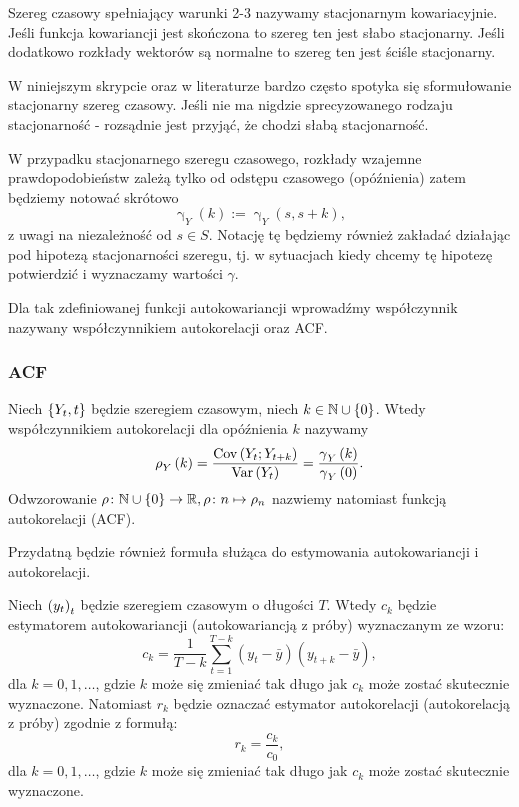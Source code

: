 \documentclass[10pt,a4paper]{book}
\newcommand{\tsAutoCovariance}[3][\gamma]{\operatorname{#1}_{#2} \left({#3}\right)}
\newcommand{\tsAutoCorellation}[3][\rho]{\operatorname{#1}_{#2} \left({#3}\right)}
\begin{document}
\begin{remark}
Szereg czasowy spełniający warunki 2-3 nazywamy stacjonarnym kowariacyjnie. Jeśli funkcja kowariancji jest skończona to szereg ten jest słabo stacjonarny. Jeśli dodatkowo rozkłady wektorów są normalne to szereg ten jest ściśle stacjonarny.
\end{remark}

\begin{remark}
W niniejszym skrypcie oraz w literaturze bardzo często spotyka się sformułowanie stacjonarny szereg czasowy. Jeśli nie ma nigdzie sprecyzowanego rodzaju stacjonarność - rozsądnie jest przyjąć, że chodzi słabą stacjonarność.
\end{remark}

\begin{remark}
W przypadku stacjonarnego szeregu czasowego, rozkłady wzajemne prawdopodobieństw zależą tylko od odstępu czasowego (opóźnienia) zatem będziemy notować skrótowo 
$$
\tsAutoCovariance{Y}{k} := \tsAutoCovariance{Y}{s,s+k},
$$
z uwagi na niezależność od $s \in S$. Notację tę będziemy również zakładać działając pod hipotezą stacjonarności szeregu, tj. w sytuacjach kiedy chcemy tę hipotezę potwierdzić i wyznaczamy wartości $\gamma$.
\end{remark}

Dla tak zdefiniowanej funkcji autokowariancji wprowadźmy współczynnik nazywany współczynnikiem autokorelacji oraz ACF.

\subsubsection{ACF}

\begin{definition}
Niech $\left\lbrace {{Y_t}, {t}} \right\rbrace$ będzie szeregiem czasowym, niech $k \in \mathbb{N} \cup \left\lbrace {0} \right\rbrace $. Wtedy współczynnikiem autokorelacji dla opóźnienia $k$ nazywamy
$$
\tsAutoCorellation{Y}{k}= \frac{\Covariance{Y_t}{Y_{t+k}}}{\Variance{Y_t}} = \frac{\tsAutoCovariance{Y}{k} }{\tsAutoCovariance{Y}{0}}.
$$
Odwzorowanie $\rho\colon \mathbb{N} \cup \left\lbrace {0} \right\rbrace \to \mathbb{R},  \rho \colon n \mapsto \rho_n$ nazwiemy natomiast funkcją autokorelacji (ACF).
\end{definition}

Przydatną będzie również formuła służąca do estymowania autokowariancji i autokorelacji.

\begin{definition}
Niech $\left( {y_t} \right)_{t}^{}$ będzie szeregiem czasowym o długości $T$. Wtedy $c_k$ będzie estymatorem autokowariancji (autokowariancją z próby) wyznaczanym ze wzoru:
$$
c_k = \frac{1}{T-k}	 \sum_{t=1}^{T-k} (y_t - \bar{y}) (y_{t+k} - \bar{y}),
$$
dla $k = 0,1, \ldots$, gdzie $k$ może się zmieniać tak długo jak $c_k$ może zostać skutecznie wyznaczone.
Natomiast $r_k$ będzie oznaczać estymator autokorelacji (autokorelacją z próby) zgodnie z formułą:
$$
r_k = \frac{c_k}{c_0},
$$
dla $k = 0,1, \ldots$, gdzie $k$ może się zmieniać tak długo jak $c_k$ może zostać skutecznie wyznaczone.
\end{definition}
\end{document}
